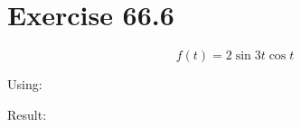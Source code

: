 \documentclass[a4paper, 10pt]{scrartcl}
\begin{document}
\section{Exercise 66.6}

\[f(t) = 2\sin{3t}\cos{t}\]

Using:

Result:
\end{document}
